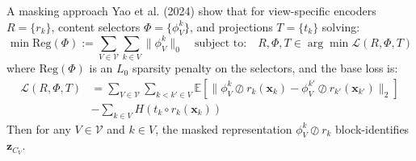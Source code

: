 \documentclass[a4paper,10pt]{beamer}
\begin{document}
\begin{frame}{A masking approach}
  Yao et al. (2024) \cite{yao2024multiviewcausalrepresentationlearning} show that for view-specific encoders $R = \{r_k\}$, content selectors $\Phi = \{\phi_V^k\}$, and projections $T = \{t_k\}$ solving:
  \begin{equation*}
    \min \text{Reg}(\Phi) := \sum_{V \in \mathcal{V}} \sum_{k \in V} \| \phi_V^{k} \|_0 \quad \text{subject to:} \quad R, \Phi, T \in \arg\min \mathcal{L}(R, \Phi, T)
  \end{equation*}
  where $\text{Reg}(\Phi)$ is an $L_0$ sparsity penalty on the selectors, and the base loss is:
  \begin{align*}
    \mathcal{L}(R, \Phi, T) &= \sum_{V \in \mathcal{V}} \sum_{k < k' \in V} \mathbb{E} \left[ \|\phi_V^k \oslash r_k(\mathbf{x}_k) - \phi_V^{k'} \oslash r_{k'}(\mathbf{x}_{k'})\|_2 \right] \\
    &- \sum_{k \in V} H(t_k \circ r_k(\mathbf{x}_k))
  \end{align*}
  Then for any $V \in \mathcal{V}$ and $k \in V$, the masked representation $\phi_V^k \oslash r_k$ block-identifies $\mathbf{z}_{C_V}$.
  \vfill
\end{frame}
\end{document}
